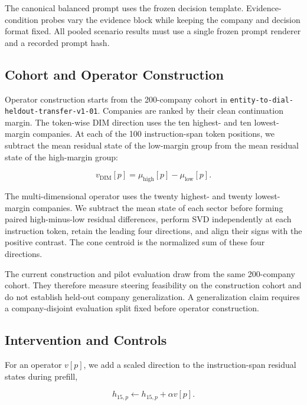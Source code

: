 \documentclass[11pt]{article}
\begin{document}
The canonical balanced prompt uses the frozen decision template. Evidence-condition probes vary the
evidence block while keeping the company and decision format fixed. All pooled scenario results must
use a single frozen prompt renderer and a recorded prompt hash.

\subsection{Cohort and Operator Construction}

Operator construction starts from the 200-company cohort in
\texttt{entity-to-dial-heldout-transfer-v1-01}. Companies are ranked by their clean continuation
margin. The token-wise DIM direction uses the ten highest- and ten lowest-margin companies. At each
of the 100 instruction-span token positions, we subtract the mean residual state of the low-margin
group from the mean residual state of the high-margin group:

\begin{equation}
v_{\mathrm{DIM}}[p] = \mu_{\mathrm{high}}[p] - \mu_{\mathrm{low}}[p].
\end{equation}

The multi-dimensional operator uses the twenty highest- and twenty lowest-margin companies. We
subtract the mean state of each sector before forming paired high-minus-low residual differences,
perform SVD independently at each instruction token, retain the leading four directions, and align
their signs with the positive contrast. The cone centroid is the normalized sum of these four
directions.

The current construction and pilot evaluation draw from the same 200-company cohort. They therefore
measure steering feasibility on the construction cohort and do not establish held-out company
generalization. A generalization claim requires a company-disjoint evaluation split fixed before
operator construction.

\subsection{Intervention and Controls}

For an operator $v[p]$, we add a scaled direction to the instruction-span residual states during
prefill,

\begin{equation}
h_{15,p} \leftarrow h_{15,p} + \alpha v[p].
\end{equation}
\end{document}
